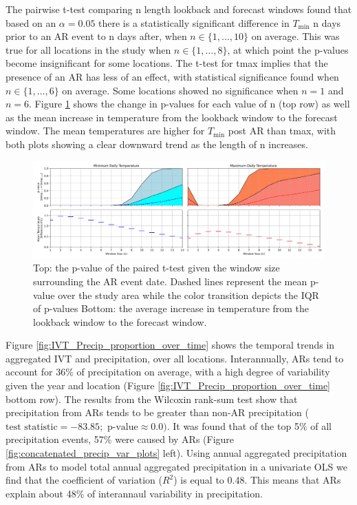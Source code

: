 \documentclass[draft]{AR_analysis_}
\begin{document}
The pairwise t-test comparing n length lookback and forecast windows
found that based on an $\alpha = 0.05$ there is a
statistically significant difference in $T_{\text{min}}$ n days prior to an AR event
to n days after, when $ n \in \{1, \ldots, 10\}$ on average.
This was true for all locations in the study when $ n \in \{1,
\ldots, 8\}$, at which point the p-values become insignificant for some
locations. The t-test for
tmax implies that the presence of an AR has less of an effect, with
statistical significance found when $ n \in \{1, \ldots, 6\}$ on
average. Some locations showed no significance when $n=1$ and $n=6$. Figure
\ref{fig:tmin_vs_tmax_subplots} shows the change in p-values for each
value of n (top row) as well as the mean increase in temperature
from the lookback window to the forecast window. The mean
temperatures are higher for $T_{\text{min}}$ post AR than tmax, with both plots
showing a clear downward trend as the length of n increases.     

\begin{figure}
\centering
\includegraphics[width=1.0\textwidth]{./images/tmin_vs_tmax_subplots.png}
\caption{Top: the p-value of the paired t-test given the
	window size surrounding the AR event date. Dashed lines
	represent the mean p-value over the study area while the color
	transition depicts the IQR of p-values Bottom: the average increase
	in temperature from the lookback window to the forecast window.}
\label{fig:tmin_vs_tmax_subplots} 
\end{figure}

Figure \ref{fig:IVT_Precip_proportion_over_time} shows the temporal
trends in aggregated IVT and precipitation,
over all locations. Interannually, ARs tend to account for 36\% of
precipitation on average, with a high degree of variability given
the year and location (Figure \ref{fig:IVT_Precip_proportion_over_time}
bottom row). The results from the Wilcoxin rank-sum test show that
precipitation from ARs tends to be greater than non-AR precipitation
($\text{test statistic} = -83.85; \text{ p-value} \approx 0.0)$. It
was found that of the top 5\% of all precipitation events, 57\% were
caused by ARs (Figure \ref{fig:concatenated_precip_var_plots} left).
Using annual aggregated precipitation from ARs to model total annual
aggregated precipitation in a univariate OLS we find that the
coefficient of variation ($R^{2}$) is equal to 0.48. This means that ARs
explain about 48\% of interannaul variability in precipitation.  
\end{document}
